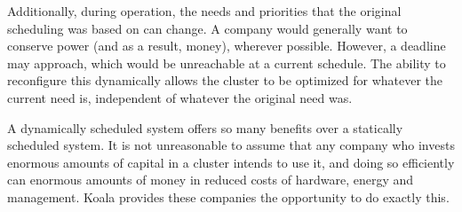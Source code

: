   Additionally, during operation, the needs and priorities that the original scheduling was based on can change.  A company would generally want to conserve power (and as a result, money), wherever possible.  However, a deadline may approach, which would be unreachable at a current schedule.  The ability to reconfigure this dynamically allows the cluster to be optimized for whatever the current need is, independent of whatever the original need was.

  A dynamically scheduled system offers so many benefits over a statically scheduled system.  It is not unreasonable to assume that any company who invests enormous amounts of capital in a cluster intends to use it, and doing so efficiently can enormous amounts of money in reduced costs of hardware, energy and management.  Koala provides these companies the opportunity to do exactly this.